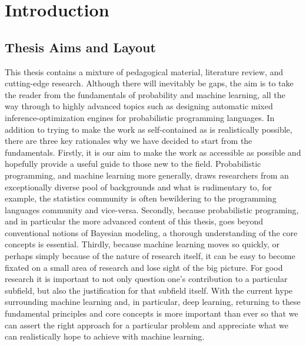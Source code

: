 
\chapter{Introduction}
\label{chp:intro}



\section{Thesis Aims and Layout}

This thesis contains a mixture of pedagogical material, literature review, and 
cutting-edge research.
Although there will inevitably be gaps, the aim is to take
the reader from the fundamentals of probability and machine learning,
all the way through to highly advanced topics such as designing automatic
mixed inference-optimization engines for probabilistic programming languages.
In addition to trying to make the work as self-contained as is realistically possible, there are
three key rationales why we have decided to start from the fundamentals.  Firstly, it is our aim to make the work 
as accessible as possible and hopefully provide a useful guide to those new to the field.
Probabilistic programming, and machine learning more generally, draws
researchers from an exceptionally diverse pool of backgrounds and what is rudimentary
to, for example, the statistics community is often bewildering to the programming
languages community and vice-versa. Secondly, because probabilistic programing, and 
in particular the more advanced content of this thesis, goes beyond conventional notions of
Bayesian modeling, a thorough understanding of the core concepts is essential.
Thirdly, because machine learning moves so quickly, or perhaps simply because
of the nature of research itself, it can be easy to become fixated on a small area of
research and lose sight of the big picture.  For good research it is important to not
only question one's contribution to a particular subfield, but also the justification for
that subfield itself.  With the current hype surrounding machine learning and, in particular,
deep learning, returning to these
fundamental principles and core concepts is more important than ever so that we can assert 
 the right approach for a particular problem and  appreciate what we can realistically
hope to achieve with machine learning.

